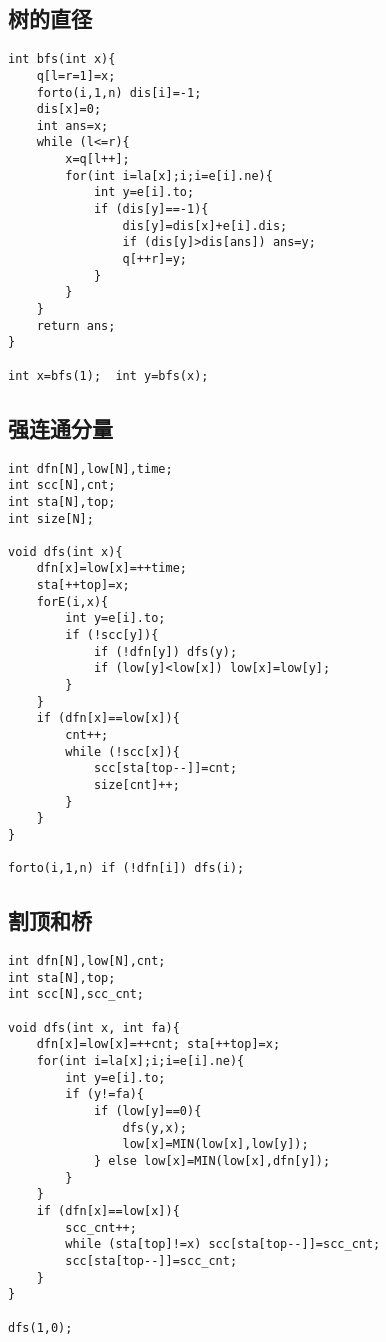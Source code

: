 \documentclass{article}
\begin{document}
\subsection{树的直径}
\begin{lstlisting}
int bfs(int x){
	q[l=r=1]=x;
	forto(i,1,n) dis[i]=-1;
	dis[x]=0;
	int ans=x;
	while (l<=r){
		x=q[l++];
		for(int i=la[x];i;i=e[i].ne){
			int y=e[i].to;
			if (dis[y]==-1){
				dis[y]=dis[x]+e[i].dis;
				if (dis[y]>dis[ans]) ans=y;
				q[++r]=y;
			}
		}
	}
	return ans;
}

int x=bfs(1);  int y=bfs(x);
\end{lstlisting}

\subsection{强连通分量}
\begin{lstlisting}
int dfn[N],low[N],time;
int scc[N],cnt;
int sta[N],top;
int size[N];

void dfs(int x){
    dfn[x]=low[x]=++time;
    sta[++top]=x;
    forE(i,x){
        int y=e[i].to;
        if (!scc[y]){
            if (!dfn[y]) dfs(y);
            if (low[y]<low[x]) low[x]=low[y];
        }
    }
    if (dfn[x]==low[x]){
        cnt++;
        while (!scc[x]){
            scc[sta[top--]]=cnt;
            size[cnt]++;
        }
    }
}

forto(i,1,n) if (!dfn[i]) dfs(i);
\end{lstlisting}

\subsection{割顶和桥}
\begin{lstlisting}
int dfn[N],low[N],cnt;
int sta[N],top;
int scc[N],scc_cnt;

void dfs(int x, int fa){
	dfn[x]=low[x]=++cnt; sta[++top]=x;
	for(int i=la[x];i;i=e[i].ne){
		int y=e[i].to;
		if (y!=fa){
			if (low[y]==0){
				dfs(y,x);
				low[x]=MIN(low[x],low[y]);
			} else low[x]=MIN(low[x],dfn[y]);
		}
	}
	if (dfn[x]==low[x]){
		scc_cnt++;
		while (sta[top]!=x) scc[sta[top--]]=scc_cnt;
		scc[sta[top--]]=scc_cnt;
	}	
}

dfs(1,0);
\end{lstlisting}
\end{document}
